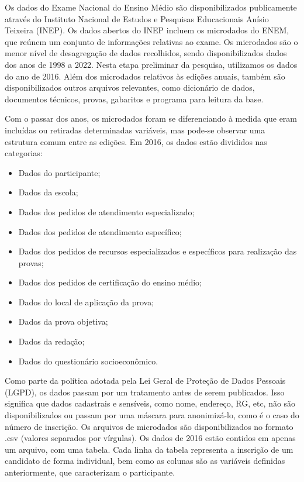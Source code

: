 Os dados do Exame Nacional do Ensino Médio são disponibilizados publicamente através do Instituto Nacional de Estudos e Pesquisas Educacionais Anísio Teixeira (INEP). Os dados abertos do INEP incluem os microdados do ENEM, que reúnem um conjunto de informações relativas ao exame. Os microdados são o menor nível de desagregação de dados recolhidos, sendo disponibilizados dados dos anos de 1998 a 2022. Nesta etapa preliminar da pesquisa, utilizamos os dados do ano de 2016. Além dos microdados relativos às edições anuais, também são disponibilizados outros arquivos relevantes, como dicionário de dados, documentos técnicos, provas, gabaritos e programa para leitura da base.

Com o passar dos anos, os microdados foram se diferenciando à medida que eram incluídas ou retiradas determinadas variáveis, mas pode-se observar uma estrutura comum entre as edições. Em 2016, os dados estão divididos nas categorias:

\begin{itemize}
  \item Dados do participante; 
  \item Dados da escola;
  \item Dados dos pedidos de atendimento especializado;
  \item Dados dos pedidos de atendimento específico;
  \item Dados dos pedidos de recursos especializados e específicos para realização das provas;
  \item Dados dos pedidos de certificação do ensino médio;
  \item Dados do local de aplicação da prova;
  \item Dados da prova objetiva;
  \item Dados da redação;
  \item Dados do questionário socioeconômico.
\end{itemize}

Como parte da política adotada pela Lei Geral de Proteção de Dados Pessoais (LGPD), os dados passam por um tratamento antes de serem publicados. Isso significa que dados cadastrais e sensíveis, como nome, endereço, RG, etc, não são disponibilizados ou passam por uma máscara para anonimizá-lo, como é o caso do número de inscrição. Os arquivos de microdados são disponibilizados no formato .csv (valores separados por vírgulas). Os dados de 2016 estão contidos em apenas um arquivo, com uma tabela. Cada linha da tabela representa a inscrição de um candidato de forma individual, bem como as colunas são as variáveis definidas anteriormente, que caracterizam o participante. 


